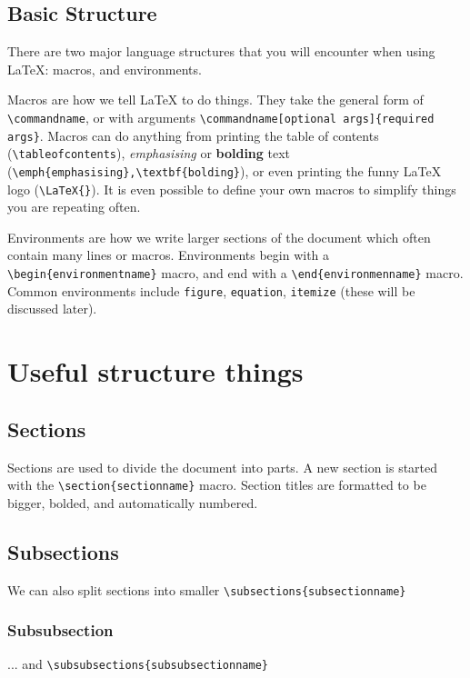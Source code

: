\documentclass{article}
\begin{document}
\subsection{Basic Structure}
There are two major language structures that you will encounter when using \LaTeX{}: macros, and environments.

Macros are how we tell \LaTeX{} to do things. They take the general form of \lstinline{\commandname}, or with arguments \lstinline|\commandname[optional args]{required args}|. Macros can do anything from printing the table of contents (\lstinline{\tableofcontents}), \emph{emphasising} or \textbf{bolding} text (\lstinline|\emph{emphasising},\textbf{bolding}|), or even printing the funny \LaTeX{} logo (\lstinline|\LaTeX{}|). It is even possible to define your own macros to simplify things you are repeating often.

Environments are how we write larger sections of the document which often contain many lines or macros. Environments begin with a \lstinline|\begin{environmentname}| macro, and end with a \lstinline|\end{environmenname}| macro. Common environments include \lstinline{figure}, \lstinline{equation}, \lstinline{itemize} (these will be discussed later).


\section{Useful structure things} %

\subsection{Sections}
Sections are used to divide the document into parts. A new section is started with the \lstinline|\section{sectionname}| macro. Section titles are formatted to be bigger, bolded, and automatically numbered.

\subsection{Subsections}
We can also split sections into smaller \lstinline|\subsections{subsectionname}|
\subsubsection{Subsubsection}
... and \lstinline|\subsubsections{subsubsectionname}|
\end{document}
